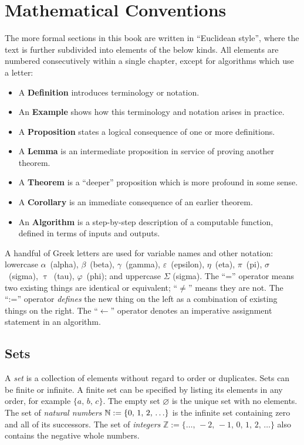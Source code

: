 \documentclass[../generics]{subfiles}
\begin{document}
\chapter{Mathematical Conventions}\label{math summary}

The more formal sections in this book are written in ``Euclidean style'', where the text is further subdivided into elements of the below kinds. All elements are numbered consecutively within a single chapter, except for algorithms which use a letter:
\begin{itemize}
\item A \textbf{Definition} introduces terminology or notation.
\item An \textbf{Example} shows how this terminology and notation arises in practice.
\item A \textbf{Proposition} states a logical consequence of one or more definitions.
\item A \textbf{Lemma} is an  intermediate proposition in service of proving another theorem.
\item A \textbf{Theorem} is a ``deeper'' proposition which is more profound in some sense.
\item A \textbf{Corollary} is an immediate consequence of an earlier theorem.
\item An \textbf{Algorithm} is a step-by-step description of a computable function, defined in terms of inputs and outputs.
\end{itemize}

A handful of Greek letters are used for variable names and other notation: lowercase $\alpha$~(alpha), $\beta$~(beta), $\gamma$~(gamma), $\varepsilon$~(epsilon), $\eta$~(eta), $\pi$~(pi), $\sigma$~(sigma), $\uptau$~(tau), $\varphi$~(phi); and uppercase $\Sigma$ (sigma). The ``='' operator means two existing things are identical or equivalent; ``$\neq$'' means they are not. The ``:='' operator \emph{defines} the new thing on the left as a combination of existing things on the right. The ``$\leftarrow$'' operator denotes an imperative assignment statement in an algorithm.

\section*{Sets}

A \emph{set} is a collection of elements without regard to order or duplicates. Sets can be finite or infinite. A finite set can be specified by listing its elements in any order, for example $\{a,\,b,\,c\}$. The empty set \index{$\varnothing$}$\varnothing$ is the unique set with no elements. The set of \emph{natural numbers} \index{$\NN$}$\mathbb{N}:=\{0,\,1,\,2,\,\ldots\}$ is the infinite set containing zero and all of its successors. The set of \emph{integers} $\mathbb{Z}:=\{\ldots,\,-2,\,-1,\,0,\,1,\,2,\,\ldots\}$ also contains the negative whole numbers.
\end{document}
